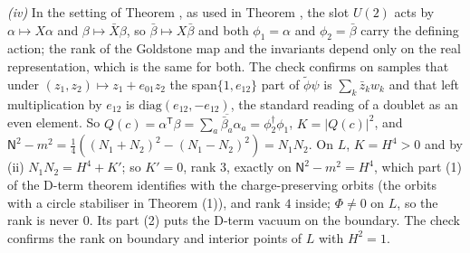 \emph{(iv)} In the setting of Theorem , as used in Theorem , the slot $U(2)$ acts by $\alpha \mapsto X\alpha$ and $\beta \mapsto \bar{X}\beta$, so $\bar{\beta} \mapsto X\bar{\beta}$ and both $\phi_{1} = \alpha$ and $\phi_{2} = \bar{\beta}$ carry the defining action; the rank of the Goldstone map and the invariants depend only on the real representation, which is the same for both. The check confirms on samples that under $(z_{1}, z_{2}) \mapsto z_{1} + e_{01}z_{2}$ the span$\{1, e_{12}\}$ part of $\widetilde{\phi}\psi$ is $\sum_{k}\bar{z}_{k}w_{k}$ and that left multiplication by $e_{12}$ is $\mathrm{diag}(e_{12}, -e_{12})$, the standard reading of a doublet as an even element. So $Q(c) = \alpha^{\mathsf T}\beta = \sum_{a}\overline{\bar{\beta}_{a}}\alpha_{a} = \phi_{2}^{\dagger}\phi_{1}$, $K = |Q(c)|^{2}$, and $\mathsf{N}^{2} - m^{2} = \tfrac14((N_{1} + N_{2})^{2} - (N_{1} - N_{2})^{2}) = N_{1}N_{2}$. On $L$, $K = H^{4} > 0$ and by (ii) $N_{1}N_{2} = H^{4} + K'$; so $K' = 0$, rank $3$, exactly on $\mathsf{N}^{2} - m^{2} = H^{4}$, which part (1) of the D-term theorem identifies with the charge-preserving orbits (the orbits with a circle stabiliser in Theorem (1)), and rank $4$ inside; $\Phi \ne 0$ on $L$, so the rank is never $0$. Its part (2) puts the D-term vacuum on the boundary. The check confirms the rank on boundary and interior points of $L$ with $H^{2} = 1$.
